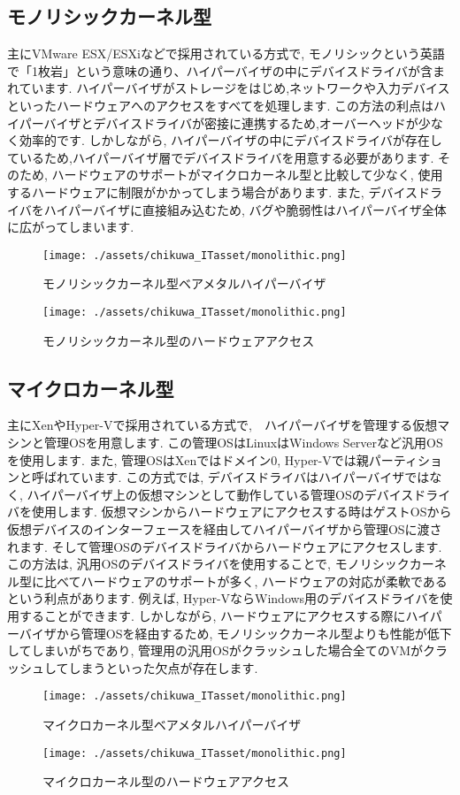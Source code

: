 \subsection{モノリシックカーネル型}
主にVMware ESX/ESXiなどで採用されている方式で, モノリシックという英語で「1枚岩」という意味の通り、ハイパーバイザの中にデバイスドライバが含まれています. ハイパーバイザがストレージをはじめ,ネットワークや入力デバイスといったハードウェアへのアクセスをすべてを処理します. この方法の利点はハイパーバイザとデバイスドライバが密接に連携するため,オーバーヘッドが少なく効率的です. しかしながら, ハイパーバイザの中にデバイスドライバが存在しているため,ハイパーバイザ層でデバイスドライバを用意する必要があります. そのため, ハードウェアのサポートがマイクロカーネル型と比較して少なく, 使用するハードウェアに制限がかかってしまう場合があります. また, デバイスドライバをハイパーバイザに直接組み込むため, バグや脆弱性はハイパーバイザ全体に広がってしまいます.
\begin{figure}[htbp]
    \centering
    \texttt{[image: ./assets/chikuwa\_ITasset/monolithic.png]}
    \caption{モノリシックカーネル型ベアメタルハイパーバイザ}
    \label{fig:monolithic}
\end{figure}
\begin{figure}[htbp]
    \centering
    \texttt{[image: ./assets/chikuwa\_ITasset/monolithic.png]}
    \caption{モノリシックカーネル型のハードウェアアクセス}
    \label{fig:monolithic_access}
\end{figure}
\subsection{マイクロカーネル型}
主にXenやHyper-Vで採用されている方式で,　ハイパーバイザを管理する仮想マシンと管理OSを用意します. この管理OSはLinuxはWindows Serverなど汎用OSを使用します. また, 管理OSはXenではドメイン0, Hyper-Vでは親パーティションと呼ばれています. この方式では, デバイスドライバはハイパーバイザではなく, ハイパーバイザ上の仮想マシンとして動作している管理OSのデバイスドライバを使用します. 仮想マシンからハードウェアにアクセスする時はゲストOSから仮想デバイスのインターフェースを経由してハイパーバイザから管理OSに渡されます. そして管理OSのデバイスドライバからハードウェアにアクセスします.この方法は, 汎用OSのデバイスドライバを使用することで, モノリシックカーネル型に比べてハードウェアのサポートが多く, ハードウェアの対応が柔軟であるという利点があります. 例えば, Hyper-VならWindows用のデバイスドライバを使用することができます. しかしながら, ハードウェアにアクセスする際にハイパーバイザから管理OSを経由するため, モノリシックカーネル型よりも性能が低下してしまいがちであり, 管理用の汎用OSがクラッシュした場合全てのVMがクラッシュしてしまうといった欠点が存在します.
\begin{figure}[htbp]
    \centering
    \texttt{[image: ./assets/chikuwa\_ITasset/monolithic.png]}
    \caption{マイクロカーネル型ベアメタルハイパーバイザ}
    \label{fig:microkernel}
\end{figure}
\begin{figure}[htbp]
    \centering
    \texttt{[image: ./assets/chikuwa\_ITasset/monolithic.png]}
    \caption{マイクロカーネル型のハードウェアアクセス}
    \label{fig:microkernel_access}
\end{figure}

